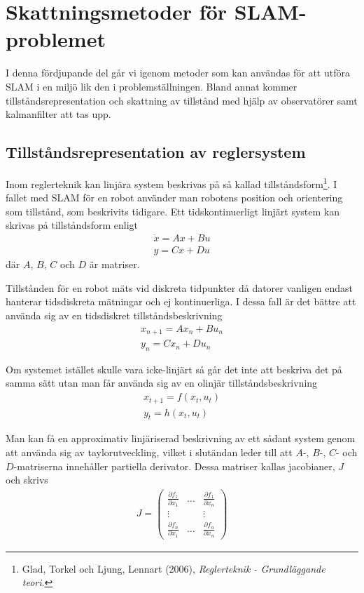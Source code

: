 \documentclass[a4paper,12pt,fleqn]{article}
\begin{document}
\newpage
\section{Skattningsmetoder för SLAM-problemet}
I denna fördjupande del går vi igenom metoder som kan användas för att utföra SLAM i en miljö lik den i problemställningen. Bland annat kommer tillståndsrepresentation och skattning av tillstånd med hjälp av observatörer samt kalmanfilter att tas upp.


\subsection{Tillståndsrepresentation av reglersystem}

Inom reglerteknik kan linjära system beskrivas på så kallad tillståndsform\footnote{Glad, Torkel och Ljung, Lennart (2006), \textit{Reglerteknik - Grundläggande teori}.}. I fallet med SLAM för en robot använder man robotens position och orientering som tillstånd, som beskrivits tidigare. Ett tidskontinuerligt linjärt system kan skrivas på tillståndsform enligt
\begin{gather}
\dot{x}=Ax+Bu \\
y=Cx+Du	
\label{equ:tillstand}
\end{gather}
där $A$, $B$, $C$ och $D$ är matriser.

Tillstånden för en robot mäts vid diskreta tidpunkter då datorer vanligen endast hanterar tidsdiskreta mätningar och ej kontinuerliga. I dessa fall är det bättre att använda sig av en tidsdiskret tillståndsbeskrivning
\begin{gather}
x_{n+1} = Ax_n + Bu_n \\
y_n = Cx_n + Du_n
\label{equ:disktillstand}
\end{gather}

Om systemet istället skulle vara icke-linjärt så går det inte att beskriva det på samma sätt utan man får använda sig av en olinjär tillståndsbeskrivning
\begin{gather}
	x_{t+1}=f(x_t,u_t)\\
	y_t=h(x_t,u_t)
\end{gather}

Man kan få en approximativ linjäriserad beskrivning av ett sådant system genom att använda sig av taylorutveckling, vilket i slutändan leder till att $A$-, $B$-, $C$- och $D$-matriserna innehåller partiella derivator. Dessa matriser kallas jacobianer, $J$ och skrivs
\begin{gather}
	J= \begin{pmatrix}
	\frac{\partial f_1}{\partial x_1} & \dots & \frac{\partial f_1}{\partial x_n} \\
	  							\vdots &       & \vdots \\
	  \frac{\partial f_n}{\partial x_1} & \dots & \frac{\partial f_n}{\partial x_n}
	  \end{pmatrix}
	  \label{equ:jacobian}
\end{gather}
\end{document}
